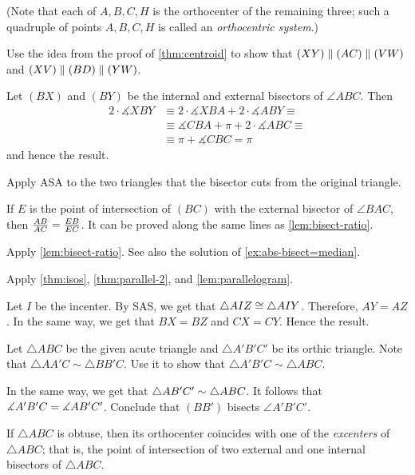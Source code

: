 \begin{multicols}{2}
(Note that each of $A,B,C,H$ is the orthocenter of the remaining three; such a quadruple of points $A,B,C,H$ is called an \emph{orthocentric system}.)

Use the idea from the proof of \ref{thm:centroid}
to show that $(XY)\z\parallel (AC)\z\parallel (VW)$ and
$(XV)\z\parallel (BD)\z\parallel (YW)$.

Let $(BX)$ and $(BY)$ be the internal and external bisectors of $\angle ABC$.
Then 
\begin{align*}
2\cdot \measuredangle XBY&\equiv2\cdot \measuredangle XBA+2\cdot \measuredangle ABY\equiv
\\
&\equiv
\measuredangle CBA+\pi+2\cdot \measuredangle ABC\equiv
\\
&\equiv\pi+\measuredangle CBC=\pi
\end{align*}
and hence the result.

Apply ASA to the two triangles that the bisector cuts from the original triangle. 

If $E$ is the point of intersection of $(BC)$ 
with the external bisector of $\angle BAC$, then 
$\frac{AB}{AC}\z=\frac{EB}{EC}$.
It can be proved along the same lines as \ref{lem:bisect-ratio}.

Apply \ref{lem:bisect-ratio}.
See also the solution of \ref{ex:abs-bisect=median}.

Apply \ref{thm:isos}, \ref{thm:parallel-2}, and \ref{lem:parallelogram}.

Let $I$ be the incenter.
By SAS, we get that $\triangle AIZ\z\cong\triangle AIY$.
Therefore, $AY=AZ$.
In the same way, we get that $BX=BZ$ and $CX=CY$.
Hence the result.

Let $\triangle ABC$ be the given acute triangle and $\triangle A'B'C'$ 
be its orthic triangle.
Note that $\triangle AA'C\sim\triangle BB'C$.
Use it to show that $\triangle A'B'C\sim \triangle ABC$.

In the same way, we get that $\triangle AB'C'\z\sim \triangle ABC$.
It follows that $\measuredangle A'B'C\z=\measuredangle AB'C'$.
Conclude that $(BB')$ bisects $\angle A'B'C'$.

If $\triangle ABC$ is obtuse, then its orthocenter coincides with one of the \emph{excenters} of $\triangle ABC$;
that is, 
the point of intersection of two external and one internal bisectors of $\triangle ABC$.


\end{multicols}
